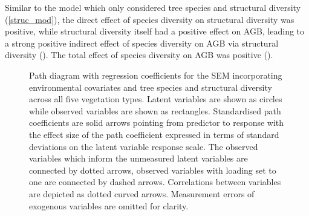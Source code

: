 \documentclass[11pt,a4paper]{article}
\begin{document}
Similar to the model which only considered tree species and structural diversity (\autoref{struc_mod}), the direct effect of species diversity on structural diversity was positive, while structural diversity itself had a positive effect on AGB, leading to a strong positive indirect effect of species diversity on AGB via structural diversity (\rgbhd{}). The total effect of species diversity on AGB was positive (\rgbd{}).

\begin{figure}[H]
\centering
	
	\caption{Path diagram with regression coefficients for the SEM incorporating environmental covariates and tree species and structural diversity across all five vegetation types. Latent variables are shown as circles while observed variables are shown as rectangles. Standardised path coefficients are solid arrows pointing from predictor to response with the effect size of the path coefficient expressed in terms of standard deviations on the latent variable response scale. The observed variables which inform the unmeasured latent variables are connected by dotted arrows, observed variables with loading set to one are connected by dashed arrows. Correlations between variables are depicted as dotted curved arrows. Measurement errors of exogenous variables are omitted for clarity.}
	\label{full_mod}
\end{figure}

\end{document}

